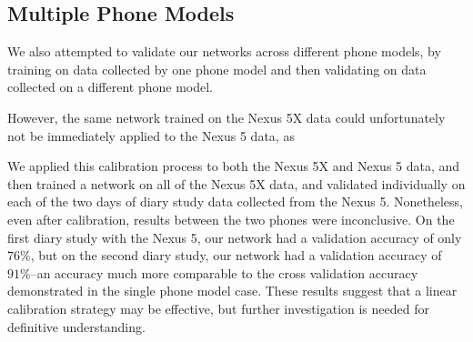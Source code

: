 \subsection{Multiple Phone Models}
We also attempted to validate our networks across different phone models, by training
on data collected by one phone model and then validating on data collected on a 
different phone model. 

However, the same network trained on the Nexus 5X data could unfortunately not be immediately
applied to the Nexus 5 data, as 

We applied this calibration process to both the Nexus 5X and Nexus 5 data, and then
trained a network on all of the Nexus 5X data, and validated individually on each of the 
two days of diary study data collected from the Nexus 5.
Nonetheless, even after calibration, results between the two phones were inconclusive. 
On the first diary study with the Nexus 5, our network
had a validation accuracy of only $76\%$, but on the second diary study, our network had a validation
accuracy of $91\%$--an accuracy much more comparable to the cross validation accuracy
demonstrated in the single phone model case. These results suggest that a linear calibration
strategy may be effective, but further investigation is needed for definitive understanding.
